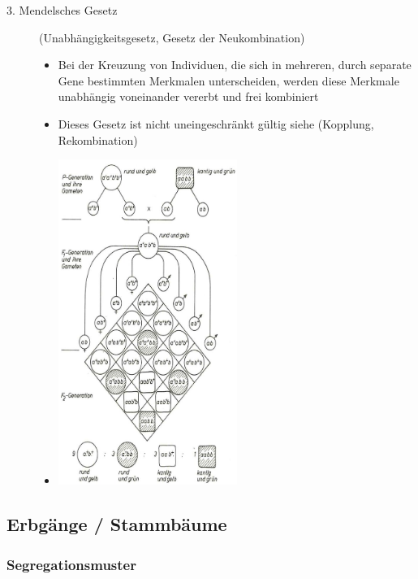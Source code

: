 \begin{description}
\begin{itemize}
        \end{itemize}
    \item[3. Mendelsches Gesetz] (Unabhängigkeitsgesetz, Gesetz der Neukombination)
        \begin{itemize}
            \item Bei der Kreuzung von Individuen, die sich in mehreren, durch separate Gene bestimmten Merkmalen unterscheiden, werden diese Merkmale unabhängig voneinander vererbt und frei kombiniert
            \item Dieses Gesetz ist nicht uneingeschränkt gültig siehe (Kopplung, Rekombination)
            \item[] \includegraphics[width=0.5\textwidth]{lectures/V3/pix/Mendel3.jpg}
        \end{itemize}
\end{description}

\subsection{Erbgänge / Stammbäume}

\subsubsection{Segregationsmuster}

